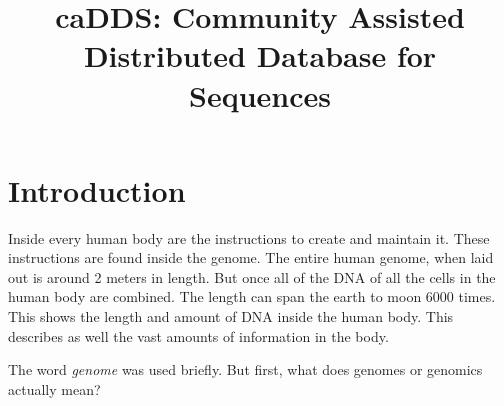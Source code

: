 \documentclass{article}
\begin{document}

\title{caDDS: Community Assisted Distributed Database for Sequences}

\author{
\and
{}
}

\maketitle


\section{Introduction}
Inside every human body are the instructions to create and maintain it. These instructions are found inside the genome. The entire human genome, when laid out is around 2 meters in length. \autocite{ency_sci_tech}
But once all of the DNA of all the cells in the human body are combined. The length can span the earth to moon 6000 times. This shows the length and amount of DNA inside the human body. This describes as well the vast amounts of information in the body. 



The word \textit{genome} was used briefly. But first, what does genomes or genomics actually mean?
\end{document}
